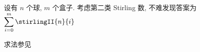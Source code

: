 设有 \(n\) 个球, \(m\) 个盒子. 考虑第二类 Stirling 数, 不难发现答案为 \(\displaystyle \sum_{i=0}^m\stirlingII{n}{i}\)

求法参见 
